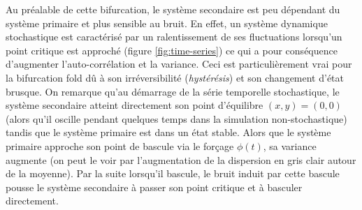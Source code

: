 Au préalable de cette bifurcation, le système secondaire est peu dépendant du système primaire et plus sensible au bruit. En effet, un système dynamique stochastique est caractérisé par un ralentissement de ses fluctuations lorsqu'un point critique est approché (figure \ref{fig:time-series}) ce qui a pour conséquence d'augmenter l'auto-corrélation et la variance. Ceci est particulièrement vrai pour la bifurcation fold dû à son irréversibilité (\emph{hystérésis}) et son changement d'état brusque. On remarque qu'au démarrage de la série temporelle stochastique, le système secondaire atteint directement son point d'équilibre $(x,y) = (0,0)$ (alors qu'il oscille pendant quelques temps dans la simulation non-stochastique) tandis que le système primaire est dans un état stable. Alors que le système primaire approche son point de bascule via le forçage $\phi(t)$, sa variance augmente (on peut le voir par l'augmentation de la dispersion en gris clair autour de la moyenne). Par la suite lorsqu'il bascule, le bruit induit par cette bascule pousse le système secondaire à passer son point critique et à basculer directement.
